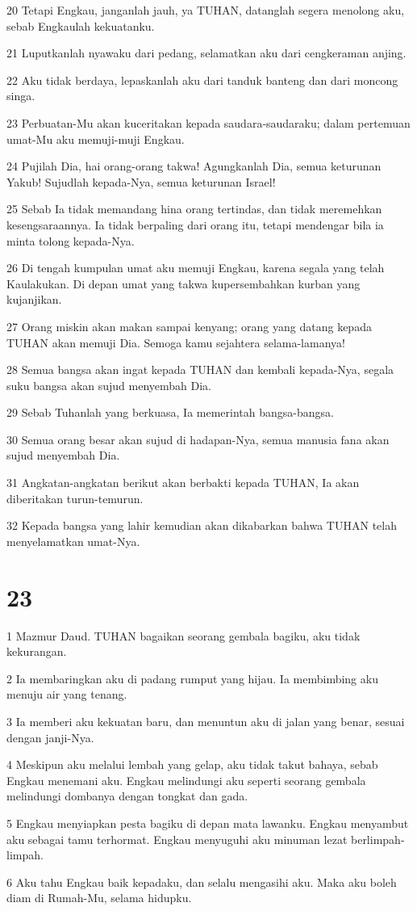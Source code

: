 \par 20 Tetapi Engkau, janganlah jauh, ya TUHAN, datanglah segera menolong aku, sebab Engkaulah kekuatanku.
\par 21 Luputkanlah nyawaku dari pedang, selamatkan aku dari cengkeraman anjing.
\par 22 Aku tidak berdaya, lepaskanlah aku dari tanduk banteng dan dari moncong singa.
\par 23 Perbuatan-Mu akan kuceritakan kepada saudara-saudaraku; dalam pertemuan umat-Mu aku memuji-muji Engkau.
\par 24 Pujilah Dia, hai orang-orang takwa! Agungkanlah Dia, semua keturunan Yakub! Sujudlah kepada-Nya, semua keturunan Israel!
\par 25 Sebab Ia tidak memandang hina orang tertindas, dan tidak meremehkan kesengsaraannya. Ia tidak berpaling dari orang itu, tetapi mendengar bila ia minta tolong kepada-Nya.
\par 26 Di tengah kumpulan umat aku memuji Engkau, karena segala yang telah Kaulakukan. Di depan umat yang takwa kupersembahkan kurban yang kujanjikan.
\par 27 Orang miskin akan makan sampai kenyang; orang yang datang kepada TUHAN akan memuji Dia. Semoga kamu sejahtera selama-lamanya!
\par 28 Semua bangsa akan ingat kepada TUHAN dan kembali kepada-Nya, segala suku bangsa akan sujud menyembah Dia.
\par 29 Sebab Tuhanlah yang berkuasa, Ia memerintah bangsa-bangsa.
\par 30 Semua orang besar akan sujud di hadapan-Nya, semua manusia fana akan sujud menyembah Dia.
\par 31 Angkatan-angkatan berikut akan berbakti kepada TUHAN, Ia akan diberitakan turun-temurun.
\par 32 Kepada bangsa yang lahir kemudian akan dikabarkan bahwa TUHAN telah menyelamatkan umat-Nya.

\chapter{23}

\par 1 Mazmur Daud. TUHAN bagaikan seorang gembala bagiku, aku tidak kekurangan.
\par 2 Ia membaringkan aku di padang rumput yang hijau. Ia membimbing aku menuju air yang tenang.
\par 3 Ia memberi aku kekuatan baru, dan menuntun aku di jalan yang benar, sesuai dengan janji-Nya.
\par 4 Meskipun aku melalui lembah yang gelap, aku tidak takut bahaya, sebab Engkau menemani aku. Engkau melindungi aku seperti seorang gembala melindungi dombanya dengan tongkat dan gada.
\par 5 Engkau menyiapkan pesta bagiku di depan mata lawanku. Engkau menyambut aku sebagai tamu terhormat. Engkau menyuguhi aku minuman lezat berlimpah-limpah.
\par 6 Aku tahu Engkau baik kepadaku, dan selalu mengasihi aku. Maka aku boleh diam di Rumah-Mu, selama hidupku.

